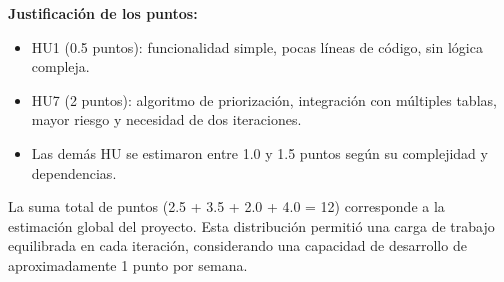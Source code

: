 \textbf{Justificación de los puntos:}
\begin{itemize}
    \item HU1 (0.5 puntos): funcionalidad simple, pocas líneas de código, sin lógica compleja.
    \item HU7 (2 puntos): algoritmo de priorización, integración con múltiples tablas, mayor riesgo y necesidad de dos iteraciones.
    \item Las demás HU se estimaron entre 1.0 y 1.5 puntos según su complejidad y dependencias.
\end{itemize}
La suma total de puntos (2.5 + 3.5 + 2.0 + 4.0 = 12) corresponde a la estimación global del proyecto. Esta distribución permitió una carga de trabajo equilibrada en cada iteración, considerando una capacidad de desarrollo de aproximadamente 1 punto por semana.
